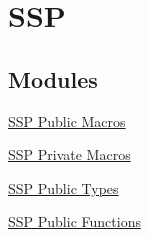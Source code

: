 \hypertarget{group___s_s_p}{\section{\-S\-S\-P}
\label{group___s_s_p}
}
\subsection*{\-Modules}
\begin{DoxyCompactItemize}
\item 
\hyperlink{group___s_s_p___public___macros}{\-S\-S\-P Public Macros}
\item 
\hyperlink{group___s_s_p___private___macros}{\-S\-S\-P Private Macros}
\item 
\hyperlink{group___s_s_p___public___types}{\-S\-S\-P Public Types}
\item 
\hyperlink{group___s_s_p___public___functions}{\-S\-S\-P Public Functions}
\end{DoxyCompactItemize}
